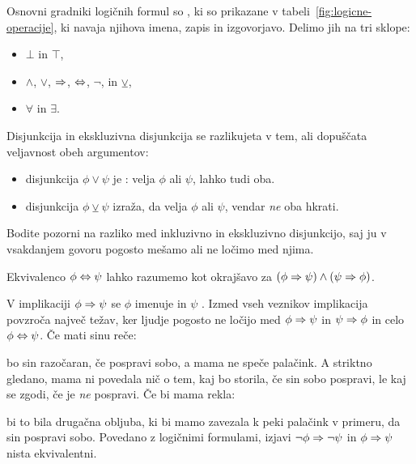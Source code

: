 Osnovni gradniki logičnih formul so , ki so prikazane v tabeli~\ref{fig:logicne-operacije},
ki navaja njihova imena, zapis in izgovorjavo.
%
Delimo jih na tri sklope:
%
\begin{itemize}
\item {} $\bot$ in $\top$,
\item {} $\land$, $\lor$, $\Rightarrow$, $\Leftrightarrow$, $\neg$, in $\veebar$,
\item {} $\forall$ in $\exists$.
\end{itemize}
%

Disjunkcija in ekskluzivna disjunkcija se razlikujeta v tem, ali dopuščata veljavnost obeh argumentov:
%
\begin{itemize}
\item disjunkcija $\phi \lor \psi$ je : velja $\phi$ ali $\psi$, lahko tudi oba.
\item {} disjunkcija $\phi \veebar \psi$ izraža, da velja $\phi$ ali $\psi$, vendar \emph{ne} oba hkrati.
\end{itemize}
%
Bodite pozorni na razliko med inkluzivno in ekskluzivno disjunkcijo, saj ju v vsakdanjem govoru pogosto mešamo ali ne ločimo med njima.

Ekvivalenco $\phi \Leftrightarrow \psi$ lahko razumemo kot okrajšavo za $(\phi \Rightarrow \psi) \land (\psi \Rightarrow \phi)$.

V implikaciji $\phi \Rightarrow \psi$ se $\phi$ imenuje  in $\psi$ . 
%
Izmed vseh veznikov implikacija povzroča največ težav, ker ljudje pogosto ne ločijo med $\phi \Rightarrow \psi$ in $\psi \Rightarrow \phi$ in celo $\phi \Leftrightarrow \psi$. Če mati sinu reče:
%
\begin{quote}
\end{quote}
%
bo sin razočaran, če pospravi sobo, a mama ne speče palačink. A striktno gledano, mama ni povedala nič o tem,
kaj bo storila, če sin sobo pospravi, le kaj se zgodi, če je \emph{ne} pospravi. Če bi mama rekla:
%
\begin{quote}
\end{quote}
%
bi to bila drugačna obljuba, ki bi mamo zavezala k peki palačink v primeru, da sin pospravi sobo.
Povedano z logičnimi formulami, izjavi $\neg \phi \Rightarrow \neg \psi$ in $\phi \Rightarrow \psi$ nista ekvivalentni.

